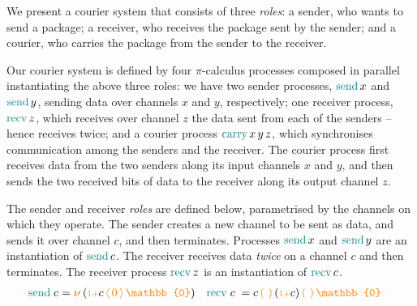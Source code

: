 \documentclass[runningheads]{llncs}
\newcommand{\picalc}{$\pi$-calculus}
\newcommand{\constr}[1]{\textcolor{orange}{\operatorname{#1}}}
\newcommand{\func}[1]{\textcolor{teal}{\operatorname{#1}}}
\newcommand{\PO}{\constr{\mathbb{0}}}
\newcommand{\new}{\constr{\boldsymbol{\nu}} \,}
\newcommand{\send}[2]{#1 \, \constr{\langle} \, #2 \,\constr{\rangle} \,}
\newcommand{\recv}[2]{#1 \, \constr{\mathbb{(}} \, #2 \, \constr{\mathbb{)}} \,}
\newcommand{\suc}{\constr{\scriptstyle 1+}}
\begin{document}
\begin{example}
\label{example-process}

We present a courier system that consists of three \emph{roles}:
a sender, who wants to send a package;
a receiver, who receives the package sent by the sender;
and a courier, who carries the package from the sender to the receiver.
\begin{center}
  \small
\end{center}

Our courier system is defined by four \picalc{} processes composed in parallel instantiating the above three roles:
we have two sender processes, $\func{send} \, x$ and $\func{send} \, y$, sending data over channels $x$ and $y$, respectively;
one receiver process, $\func{recv} \, z$, which receives over channel $z$ the data sent from each of the senders -- hence receives twice;
and a courier process $\func{carry} \, x \, y \, z$, which synchronises communication among the senders and the receiver.
The courier process first receives data from the two senders along its input channels $x$ and $y$, and then sends the two received bits of data to the receiver along its output channel $z$.

The sender and receiver \emph{roles} are defined below, parametrised by the channels on which they operate.
The sender creates a new channel to be sent as data, and sends it over channel $c$, and then terminates.
Processes $\func{send} \, x$ and $\func{send} \, y$ are an instantiation of $\func{send} \, c$.
The receiver receives data \emph{twice} on a channel $c$ and then terminates.
The receiver process $\func{recv} \, z$ is an instantiation of $\func{recv} \, c$.
\begin{align*}
  & \func{send} \; c = \new{} (\send{\suc c}{\constr{0}} \PO) &&
    \func{recv} \; c \; = \recv{c}{} \recv{(\suc c)}{} \PO
\end{align*}


\end{example}
\end{document}
